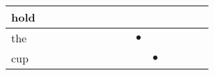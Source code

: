 \documentclass[landscape]{article}
\newcommand{\ssp}{\hspace{2pt}}
\newcommand{\mex}{\cellcolor{g}$\bullet$}
\begin{document}
\begin{tabular}{|l|p{10pt}|p{10pt}|p{10pt}|p{10pt}|p{10pt}|p{10pt}|p{10pt}|p{10pt}|p{10pt}|p{10pt}|p{10pt}|p{10pt}|p{10pt}|p{10pt}|}
\hline
\ssp hold \ssp&\hspace{2pt}&\hspace{2pt}&\hspace{2pt}&\hspace{2pt}&\hspace{2pt}&\hspace{2pt}&\hspace{2pt}&\hspace{2pt}&\hspace{2pt}&\hspace{2pt}&\hspace{2pt}&\hspace{2pt}&\hspace{2pt}&\hspace{2pt}\\
\hline
\ssp \cellcolor{ref8}the \ssp&\hspace{2pt}&\hspace{2pt}&\hspace{2pt}&\hspace{2pt}&\hspace{2pt}&\hspace{2pt}&\hspace{2pt}&\hspace{2pt}&\hspace{2pt}\mex&\hspace{2pt}&\hspace{2pt}&\hspace{2pt}&\hspace{2pt}&\hspace{2pt}\\
\hline
\ssp \cellcolor{ref9}cup \ssp&\hspace{2pt}&\hspace{2pt}&\hspace{2pt}&\hspace{2pt}&\hspace{2pt}&\hspace{2pt}&\hspace{2pt}&\hspace{2pt}&\hspace{2pt}&\hspace{2pt}\mex&\hspace{2pt}&\hspace{2pt}&\hspace{2pt}&\hspace{2pt}\\
\hline

\end{tabular}
\end{document}

